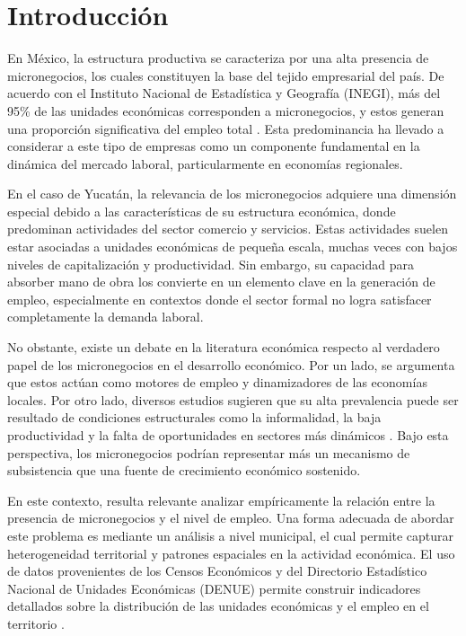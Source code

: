 \section{Introducción}

En México, la estructura productiva se caracteriza por una alta presencia de micronegocios, los cuales constituyen la base del tejido empresarial del país. De acuerdo con el Instituto Nacional de Estadística y Geografía (INEGI), más del 95\% de las unidades económicas corresponden a micronegocios, y estos generan una proporción significativa del empleo total \cite{inegi2019}. Esta predominancia ha llevado a considerar a este tipo de empresas como un componente fundamental en la dinámica del mercado laboral, particularmente en economías regionales.

En el caso de Yucatán, la relevancia de los micronegocios adquiere una dimensión especial debido a las características de su estructura económica, donde predominan actividades del sector comercio y servicios. Estas actividades suelen estar asociadas a unidades económicas de pequeña escala, muchas veces con bajos niveles de capitalización y productividad. Sin embargo, su capacidad para absorber mano de obra los convierte en un elemento clave en la generación de empleo, especialmente en contextos donde el sector formal no logra satisfacer completamente la demanda laboral.

No obstante, existe un debate en la literatura económica respecto al verdadero papel de los micronegocios en el desarrollo económico. Por un lado, se argumenta que estos actúan como motores de empleo y dinamizadores de las economías locales. Por otro lado, diversos estudios sugieren que su alta prevalencia puede ser resultado de condiciones estructurales como la informalidad, la baja productividad y la falta de oportunidades en sectores más dinámicos \cite{laporta2014}. Bajo esta perspectiva, los micronegocios podrían representar más un mecanismo de subsistencia que una fuente de crecimiento económico sostenido.

En este contexto, resulta relevante analizar empíricamente la relación entre la presencia de micronegocios y el nivel de empleo. Una forma adecuada de abordar este problema es mediante un análisis a nivel municipal, el cual permite capturar heterogeneidad territorial y patrones espaciales en la actividad económica. El uso de datos provenientes de los Censos Económicos y del Directorio Estadístico Nacional de Unidades Económicas (DENUE) permite construir indicadores detallados sobre la distribución de las unidades económicas y el empleo en el territorio \cite{denue}.

